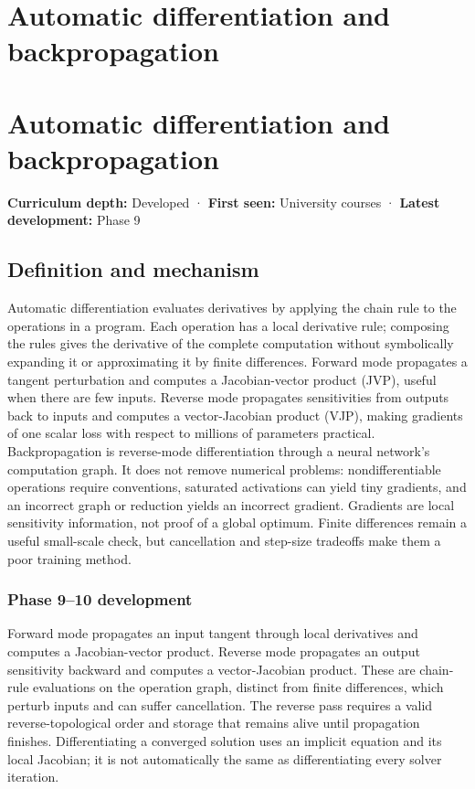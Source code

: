 \hypertarget{appendix-40df0855b4a7}{}
\section*{Automatic differentiation and backpropagation}
\section{Automatic differentiation and backpropagation}\label{automatic-differentiation-and-backpropagation}

\textbf{Curriculum depth:} Developed · \textbf{First seen:} University courses · \textbf{Latest development:} Phase 9

\subsection{Definition and mechanism}\label{definition-and-mechanism}

Automatic differentiation evaluates derivatives by applying the chain rule to the operations in a program. Each operation has a local derivative rule; composing the rules gives the derivative of the complete computation without symbolically expanding it or approximating it by finite differences. Forward mode propagates a tangent perturbation and computes a Jacobian-vector product (JVP), useful when there are few inputs. Reverse mode propagates sensitivities from outputs back to inputs and computes a vector-Jacobian product (VJP), making gradients of one scalar loss with respect to millions of parameters practical. Backpropagation is reverse-mode differentiation through a neural network's computation graph. It does not remove numerical problems: nondifferentiable operations require conventions, saturated activations can yield tiny gradients, and an incorrect graph or reduction yields an incorrect gradient. Gradients are local sensitivity information, not proof of a global optimum. Finite differences remain a useful small-scale check, but cancellation and step-size tradeoffs make them a poor training method.

\subsubsection{Phase 9--10 development}\label{phase-910-development}

Forward mode propagates an input tangent through local derivatives and computes a Jacobian-vector product. Reverse mode propagates an output sensitivity backward and computes a vector-Jacobian product. These are chain-rule evaluations on the operation graph, distinct from finite differences, which perturb inputs and can suffer cancellation. The reverse pass requires a valid reverse-topological order and storage that remains alive until propagation finishes. Differentiating a converged solution uses an implicit equation and its local Jacobian; it is not automatically the same as differentiating every solver iteration.

